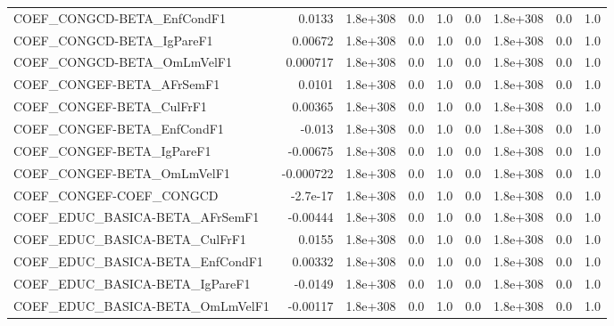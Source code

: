 \begin{tabular}{lrrrrrrrr}
COEF\_CONGCD-BETA\_EnfCondF1            &      0.0133 &     1.8e+308 &     0.0 &      1.0 &        0.0 &    1.8e+308 &          0.0 &           1.0 \\
COEF\_CONGCD-BETA\_IgPareF1             &     0.00672 &     1.8e+308 &     0.0 &      1.0 &        0.0 &    1.8e+308 &          0.0 &           1.0 \\
COEF\_CONGCD-BETA\_OmLmVelF1            &    0.000717 &     1.8e+308 &     0.0 &      1.0 &        0.0 &    1.8e+308 &          0.0 &           1.0 \\
COEF\_CONGEF-BETA\_AFrSemF1             &      0.0101 &     1.8e+308 &     0.0 &      1.0 &        0.0 &    1.8e+308 &          0.0 &           1.0 \\
COEF\_CONGEF-BETA\_CulFrF1              &     0.00365 &     1.8e+308 &     0.0 &      1.0 &        0.0 &    1.8e+308 &          0.0 &           1.0 \\
COEF\_CONGEF-BETA\_EnfCondF1            &      -0.013 &     1.8e+308 &     0.0 &      1.0 &        0.0 &    1.8e+308 &          0.0 &           1.0 \\
COEF\_CONGEF-BETA\_IgPareF1             &    -0.00675 &     1.8e+308 &     0.0 &      1.0 &        0.0 &    1.8e+308 &          0.0 &           1.0 \\
COEF\_CONGEF-BETA\_OmLmVelF1            &   -0.000722 &     1.8e+308 &     0.0 &      1.0 &        0.0 &    1.8e+308 &          0.0 &           1.0 \\
COEF\_CONGEF-COEF\_CONGCD               &    -2.7e-17 &     1.8e+308 &     0.0 &      1.0 &        0.0 &    1.8e+308 &          0.0 &           1.0 \\
COEF\_EDUC\_BASICA-BETA\_AFrSemF1        &    -0.00444 &     1.8e+308 &     0.0 &      1.0 &        0.0 &    1.8e+308 &          0.0 &           1.0 \\
COEF\_EDUC\_BASICA-BETA\_CulFrF1         &      0.0155 &     1.8e+308 &     0.0 &      1.0 &        0.0 &    1.8e+308 &          0.0 &           1.0 \\
COEF\_EDUC\_BASICA-BETA\_EnfCondF1       &     0.00332 &     1.8e+308 &     0.0 &      1.0 &        0.0 &    1.8e+308 &          0.0 &           1.0 \\
COEF\_EDUC\_BASICA-BETA\_IgPareF1        &     -0.0149 &     1.8e+308 &     0.0 &      1.0 &        0.0 &    1.8e+308 &          0.0 &           1.0 \\
COEF\_EDUC\_BASICA-BETA\_OmLmVelF1       &    -0.00117 &     1.8e+308 &     0.0 &      1.0 &        0.0 &    1.8e+308 &          0.0 &           1.0 \\

\end{tabular}
